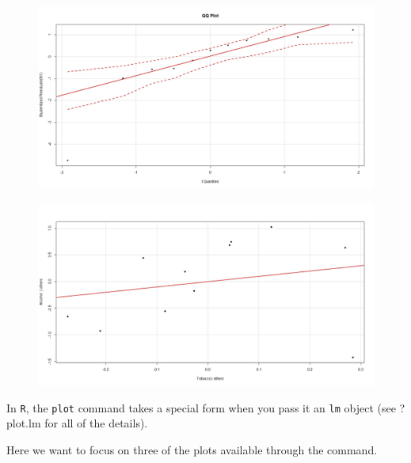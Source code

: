 \documentclass[residuals.tex]{subfiles}
\begin{document}
\begin{figure}
\centering
\includegraphics[width=1.2\linewidth]{alcotob3}
\end{figure}


\begin{figure}
	\centering
	\includegraphics[width=1.2\linewidth]{alcotob4}
\end{figure}


In \texttt{R}, the \texttt{plot} command takes a
special form when you pass it an \texttt{lm} object (see ?plot.lm for all of the
details). 




Here we want to focus on three of the plots available through
the command.
\end{document}
